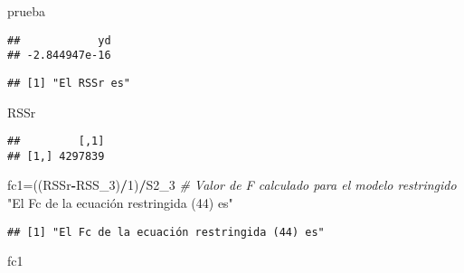 \documentclass[
]{article}
\newenvironment{Shaded}{\begin{snugshade}}{\end{snugshade}}
\newcommand{\CommentTok}[1]{\textcolor[rgb]{0.56,0.35,0.01}{\textit{#1}}}
\newcommand{\DecValTok}[1]{\textcolor[rgb]{0.00,0.00,0.81}{#1}}
\newcommand{\KeywordTok}[1]{\textcolor[rgb]{0.13,0.29,0.53}{\textbf{#1}}}
\newcommand{\NormalTok}[1]{#1}
\newcommand{\OperatorTok}[1]{\textcolor[rgb]{0.81,0.36,0.00}{\textbf{#1}}}
\newcommand{\StringTok}[1]{\textcolor[rgb]{0.31,0.60,0.02}{#1}}
\begin{document}
\begin{Shaded}
\begin{Highlighting}[]
\NormalTok{prueba}
\end{Highlighting}
\end{Shaded}

\begin{verbatim}
##            yd 
## -2.844947e-16
\end{verbatim}

\begin{Shaded}
\end{Shaded}

\begin{verbatim}
## [1] "El RSSr es"
\end{verbatim}

\begin{Shaded}
\begin{Highlighting}[]
\NormalTok{RSSr}
\end{Highlighting}
\end{Shaded}

\begin{verbatim}
##         [,1]
## [1,] 4297839
\end{verbatim}

\begin{Shaded}
\begin{Highlighting}[]
\NormalTok{fc1=((RSSr}\OperatorTok{-}\NormalTok{RSS_}\DecValTok{3}\NormalTok{)}\OperatorTok{/}\DecValTok{1}\NormalTok{)}\OperatorTok{/}\NormalTok{S2_}\DecValTok{3}     \CommentTok{#  Valor de F calculado para el modelo restringido }
\StringTok{"El Fc de la ecuación restringida (44) es"}
\end{Highlighting}
\end{Shaded}

\begin{verbatim}
## [1] "El Fc de la ecuación restringida (44) es"
\end{verbatim}

\begin{Shaded}
\begin{Highlighting}[]
\NormalTok{fc1}
\end{Highlighting}
\end{Shaded}
\end{document}
